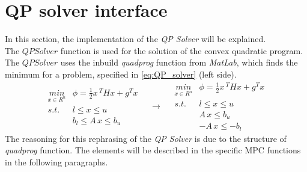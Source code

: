 \section{QP solver interface}
\label{sec:QPsolver}
In this section, the implementation of the \textit{QP Solver} will be explained.\\
The $QP Solver$ function is used for the solution of the convex quadratic program. The $QP Solver$ uses the inbuild \textit{quadprog} function from \textit{MatLab}, which finds the minimum for a problem, specified in \cref{eq:QP_solver} (left side).
\begin{equation}
    \begin{matrix}
        \underset{x\in R^n}{min} & \phi=\frac{1}{2}x\,^THx+g^Tx \\
        s.t. & l \leq x \leq u \\
        & b_l \leq A\,x \leq b_u
    \end{matrix} \quad \xrightarrow{} \quad
    \begin{matrix}
        \underset{x\in R^n}{min} & \phi=\frac{1}{2}x\,^THx+g^Tx \\
        s.t. & l \leq x \leq u \\
        & A\,x \leq b_u\\
        & -A\,x \leq -b_l
    \end{matrix}
    \label{eq:QP_solver}
\end{equation}
The reasoning for this rephrasing of the \textit{QP Solver} is due to the structure of \textit{quadprog} function. The elements will be described in the specific MPC functions in the following paragraphs.